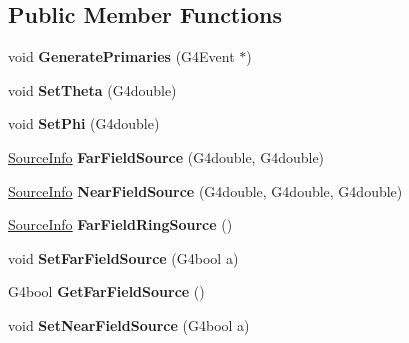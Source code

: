 \subsection*{Public Member Functions}
\begin{DoxyCompactItemize}
\item 
\hypertarget{class_primary_generator_action_a8c796e33304646f4d9d905dbc6f2abc5}{}\label{class_primary_generator_action_a8c796e33304646f4d9d905dbc6f2abc5} 
void {\bfseries Generate\+Primaries} (G4\+Event $\ast$)
\item 
\hypertarget{class_primary_generator_action_a46e67f9f730f414b343ee0e9a6226593}{}\label{class_primary_generator_action_a46e67f9f730f414b343ee0e9a6226593} 
void {\bfseries Set\+Theta} (G4double)
\item 
\hypertarget{class_primary_generator_action_a4615be87989e5bab795be0f3c0daada1}{}\label{class_primary_generator_action_a4615be87989e5bab795be0f3c0daada1} 
void {\bfseries Set\+Phi} (G4double)
\item 
\hypertarget{class_primary_generator_action_afb42286a618c737e0c033f2d2b2aa0c6}{}\label{class_primary_generator_action_afb42286a618c737e0c033f2d2b2aa0c6} 
\hyperlink{class_source_info}{Source\+Info} {\bfseries Far\+Field\+Source} (G4double, G4double)
\item 
\hypertarget{class_primary_generator_action_a039de9ae41c3099eedf5a18b6bb8f17a}{}\label{class_primary_generator_action_a039de9ae41c3099eedf5a18b6bb8f17a} 
\hyperlink{class_source_info}{Source\+Info} {\bfseries Near\+Field\+Source} (G4double, G4double, G4double)
\item 
\hypertarget{class_primary_generator_action_ac3e39c56ddd81eda91b7fa84a64483bd}{}\label{class_primary_generator_action_ac3e39c56ddd81eda91b7fa84a64483bd} 
\hyperlink{class_source_info}{Source\+Info} {\bfseries Far\+Field\+Ring\+Source} ()
\item 
\hypertarget{class_primary_generator_action_a57d8c467d8ca74c0de5d2f774f24ba1e}{}\label{class_primary_generator_action_a57d8c467d8ca74c0de5d2f774f24ba1e} 
void {\bfseries Set\+Far\+Field\+Source} (G4bool a)
\item 
\hypertarget{class_primary_generator_action_aba4ef4e85620251297b1ee158eaea61e}{}\label{class_primary_generator_action_aba4ef4e85620251297b1ee158eaea61e} 
G4bool {\bfseries Get\+Far\+Field\+Source} ()
\item 
\hypertarget{class_primary_generator_action_a6fb956c60f2492ffda06a632e81717f5}{}\label{class_primary_generator_action_a6fb956c60f2492ffda06a632e81717f5} 
void {\bfseries Set\+Near\+Field\+Source} (G4bool a)

\end{DoxyCompactItemize}
